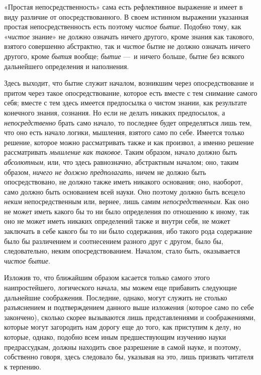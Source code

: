 «Простая непосредственность» сама есть рефлективное выражение и имеет в виду
различие от опосредствованного. В своем истинном выражении указанная
простая непосредственность есть поэтому {\em чистое
бытие}. Подобно тому, как «{\em чистое} знание» не
должно означать ничего другого, кроме знания как такового, взятого
совершенно абстрактно, так и {\em чистое} бытие не
должно означать ничего другого, кроме {\em бытия}
вообще; {\em бытие} —~и ничего больше, бытие без
всякого дальнейшего определения и наполнения.

Здесь выходит, что бытие служит началом, возникшим через опосредствование и
притом через такое опосредствование, которое есть вместе с тем снимание
самого себя; вместе с тем здесь имеется предпосылка о чистом знании, как
результате конечного знания, сознания. Но если не делать никаких
предпосылок, а {\em непосредственно} брать само начало,
то последнее будет определяться лишь тем, что оно есть начало логики,
мышления, взятого само по себе. Имеется только решение, которое можно
рассматривать также и как произвол, а именно решение рассматривать
{\em мышление как таковое}. Таким образом, начало должно
быть {\em абсолютным}, или, что здесь равнозначно,
абстрактным началом; оно, таким образом, {\em ничего не
должно предполагать}, ничем не должно быть опосредствовано, не должно также
иметь никакого основания; оно, наоборот, само должно быть основанием всей
науки. Оно поэтому должно быть всецело {\em неким}
непосредственным или, вернее, лишь самим
{\em непосредственным}. Как оно не может иметь какого
бы то ни было определения по отношению к иному, так оно не может иметь
никаких определений также и внутри себя, не может заключать в себе какого
бы то ни было содержания, ибо такого рода содержание было бы различением и
соотнесением разного друг с другом, было бы, следовательно, неким
опосредствованием. Началом, стало быть, оказывается
{\em чистое бытие}.

Изложив то, что ближайшим образом касается только самого этого
наипростейшего, логического начала, мы можем еще прибавить следующие
дальнейшие соображения. Последние, однако, могут служить не столько
разъяснением и подтверждением данного выше изложения (которое само по себе
закончено), сколько скорее вызываются лишь представлениями и соображениями,
которые могут загородить нам дорогу еще до того, как приступим к делу, но
которые, однако, подобно всем иным предшествующим изучению науки
предрассудкам, должны находить свое разрешение в самой науке, и поэтому,
собственно говоря, здесь следовало бы, указывая на это, лишь призвать
читателя к терпению.

